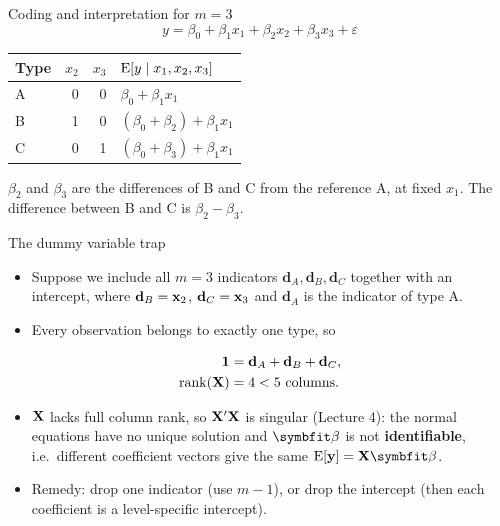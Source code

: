 \begin{frame}{Coding and interpretation for $m = 3$}
    \[
        y = \beta_0 + \beta_1 x_1 + \beta_2 x_2 + \beta_3 x_3 + \varepsilon
    \]
    \centering
    \small
    \begin{tabular}{lrrl}
        \toprule
        Type & $x_2$ & $x_3$ & $\operatorname{E}[y \mid x_1, x_2, x_3]$ \\
        \midrule
        A & 0 & 0 & $\beta_0 + \beta_1 x_1$ \\
        B & 1 & 0 & $(\beta_0 + \beta_2) + \beta_1 x_1$ \\
        C & 0 & 1 & $(\beta_0 + \beta_3) + \beta_1 x_1$ \\
        \bottomrule
    \end{tabular}

    \vspace{0.8em}
    \raggedright
    $\beta_2$ and $\beta_3$ are the differences of B and C from the reference A, at fixed $x_1$. The difference between B and C is $\beta_2 - \beta_3$.
\end{frame}


\begin{frame}{The dummy variable trap}
    \begin{itemize}
        \item Suppose we include all $m = 3$ indicators $\mathbf{d}_A, \mathbf{d}_B, \mathbf{d}_C$ together with an intercept, where $\mathbf{d}_B = \mathbf{x}_2$, $\mathbf{d}_C = \mathbf{x}_3$ and $\mathbf{d}_A$ is the indicator of type A.
        \item Every observation belongs to exactly one type, so
    \end{itemize}
    \begin{align*}
        \mathbf{1} &= \mathbf{d}_A + \mathbf{d}_B + \mathbf{d}_C, \\
        \operatorname{rank}(\mathbf{X}) &= 4 < 5 \text{ columns}.
    \end{align*}
    \begin{itemize}
        \item $\mathbf{X}$ lacks full column rank, so $\mathbf{X}' \mathbf{X}$ is singular (Lecture 4): the normal equations have no unique solution and $\bbeta$ is not \textbf{identifiable}, i.e.\ different coefficient vectors give the same $\E[\by] = \bX\bbeta$.
        \item Remedy: drop one indicator (use $m-1$), or drop the intercept (then each coefficient is a level-specific intercept).
    \end{itemize}
\end{frame}



